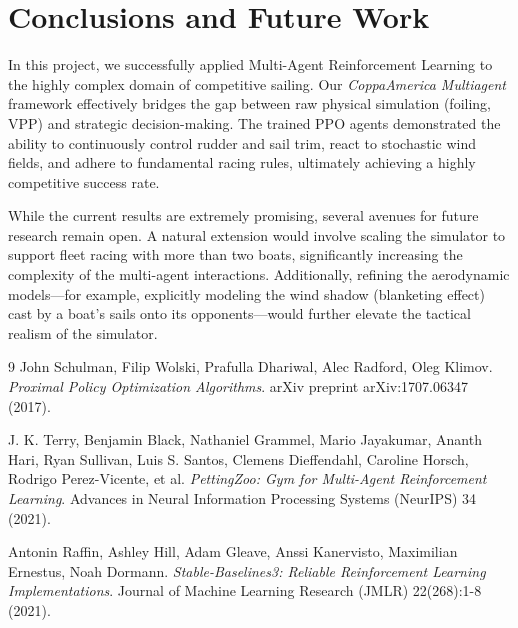 \documentclass{article}
\begin{document}
\section{Conclusions and Future Work}
In this project, we successfully applied Multi-Agent Reinforcement Learning to the highly complex domain of competitive sailing. Our \textit{CoppaAmerica Multiagent} framework effectively bridges the gap between raw physical simulation (foiling, VPP) and strategic decision-making. The trained PPO agents demonstrated the ability to continuously control rudder and sail trim, react to stochastic wind fields, and adhere to fundamental racing rules, ultimately achieving a highly competitive success rate.

While the current results are extremely promising, several avenues for future research remain open. A natural extension would involve scaling the simulator to support fleet racing with more than two boats, significantly increasing the complexity of the multi-agent interactions. Additionally, refining the aerodynamic models---for example, explicitly modeling the wind shadow (blanketing effect) cast by a boat's sails onto its opponents---would further elevate the tactical realism of the simulator.

\begin{thebibliography}{9}
John Schulman, Filip Wolski, Prafulla Dhariwal, Alec Radford, Oleg Klimov. 
\textit{Proximal Policy Optimization Algorithms}. 
arXiv preprint arXiv:1707.06347 (2017).

J. K. Terry, Benjamin Black, Nathaniel Grammel, Mario Jayakumar, Ananth Hari, Ryan Sullivan, Luis S. Santos, Clemens Dieffendahl, Caroline Horsch, Rodrigo Perez-Vicente, et al. 
\textit{PettingZoo: Gym for Multi-Agent Reinforcement Learning}. 
Advances in Neural Information Processing Systems (NeurIPS) 34 (2021).

Antonin Raffin, Ashley Hill, Adam Gleave, Anssi Kanervisto, Maximilian Ernestus, Noah Dormann. 
\textit{Stable-Baselines3: Reliable Reinforcement Learning Implementations}. 
Journal of Machine Learning Research (JMLR) 22(268):1-8 (2021).
\end{thebibliography}
\end{document}
